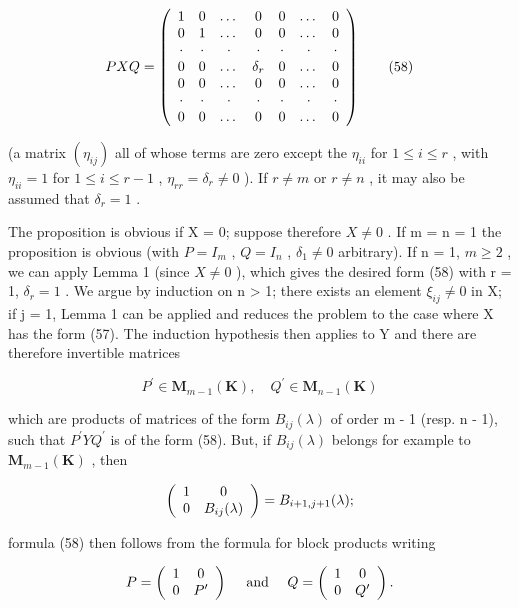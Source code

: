 \[
P X Q = \left( \begin{array}{c c c c c c c} 1 & 0 & \dots & 0 & 0 & \dots & 0 \\ 0 & 1 & \dots & 0 & 0 & \dots & 0 \\ \cdot & \cdot & \cdot & \cdot & \cdot & \cdot & \cdot \\ 0 & 0 & \dots & \delta_ {r} & 0 & \dots & 0 \\ 0 & 0 & \dots & 0 & 0 & \dots & 0 \\ \cdot & \cdot & \cdot & \cdot & \cdot & \cdot & \cdot \\ 0 & 0 & \dots & 0 & 0 & \dots & 0 \end{array} \right)\tag{58}
\]

(a matrix \((\eta_{ij})\) all of whose terms are zero except the \(\eta_{ii}\) for \(1 \leqslant i \leqslant r\) , with \(\eta_{ii} = 1\) for \(1 \leqslant i \leqslant r - 1\) , \(\eta_{rr} = \delta_r \neq 0\) ). If \(r \neq m\) or \(r \neq n\) , it may also be assumed that \(\delta_r = 1\) .

The proposition is obvious if X = 0; suppose therefore \(X \neq 0\) . If m = n = 1 the proposition is obvious (with \(P = I_{m}\) , \(Q = I_{n}\) , \(\delta_{1} \neq 0\) arbitrary). If n = 1, \(m \geqslant 2\) , we can apply Lemma 1 (since \(X \neq 0\) ), which gives the desired form (58) with r = 1, \(\delta_{r} = 1\) . We argue by induction on n \textgreater{} 1; there exists an element \(\xi_{ij} \neq 0\) in X; if j = 1, Lemma 1 can be applied and reduces the problem to the case where X has the form (57). The induction hypothesis then applies to Y and there are therefore invertible matrices

\[
P ^ {\prime} \in \mathbf {M} _ {m - 1} (\mathbf {K}), \quad Q ^ {\prime} \in \mathbf {M} _ {n - 1} (\mathbf {K})
\]

which are products of matrices of the form \(B_{ij}(\lambda)\) of order m - 1 (resp. n - 1), such that \(P^{\prime}YQ^{\prime}\) is of the form (58). But, if \(B_{ij}(\lambda)\) belongs for example to \(\mathbf{M}_{m-1}(\mathbf{K})\) , then

\[
\left( \begin{array}{c c} 1 & 0 \\ 0 & B _ {i j} (\lambda) \end{array} \right) = B _ {i + 1, j + 1} (\lambda);
\]

formula (58) then follows from the formula for block products writing

\[
P = \left( \begin{array}{c c} 1 & 0 \\ 0 & P ^ {\prime} \end{array} \right) \quad \text { and } \quad Q = \left( \begin{array}{c c} 1 & 0 \\ 0 & Q ^ {\prime} \end{array} \right).
\]

